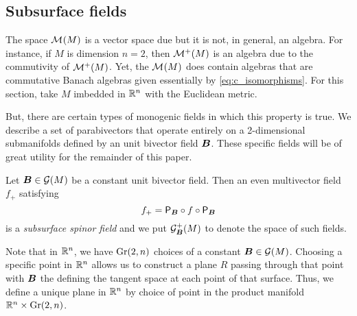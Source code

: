 \subsection{Subsurface fields}

The space $\mathcal{M}^{}(M)$ is a vector space due but it is not, in general, an algebra. For instance, if $M$ is dimension $n=2$, then $\mathcal{M}^{+}(M)$ is an algebra due to the commutivity of $\mathcal{M}^{+}(M)$. Yet, the $\mathcal{M}^{}(M)$ does contain algebras that are commutative Banach algebras given essentially by \cref{eq:c_isomorphisms}. For this section, take $M$ imbedded in $\mathbb{R}^n$ with the Euclidean metric.

But, there are certain types of monogenic fields in which this property is true. We describe a set of parabivectors that operate entirely on a 2-dimensional submanifolds defined by an unit bivector field $\boldsymbol{B}$. These specific fields will be of great utility for the remainder of this paper.
\begin{definition}
    Let $\boldsymbol{B} \in \mathcal{G}(M)$ be a constant unit bivector field. Then an even multivector field $f_+$ satisfying
    \begin{equation}
    f_+ = \mathsf{P}_{\boldsymbol{B}} \circ f \circ \mathsf{P}_{\boldsymbol{B}}
    \end{equation}
    is a \emph{subsurface spinor field} and we put $\mathcal{G}_{\boldsymbol{B}}^+(M)$ to denote the space of such fields.
\end{definition} 
Note that in $\mathbb{R}^n$, we have $\operatorname{Gr}(2,n)$ choices of a constant $\boldsymbol{B}\in \mathcal{G}(M)$. Choosing a specific point in $\mathbb{R}^n$ allows us to construct a plane $R$ passing through that point with $\boldsymbol{B}$ the defining the tangent space at each point of that surface. Thus, we define a unique plane in $\mathbb{R}^n$ by choice of point in the product manifold $\mathbb{R}^n \times \operatorname{Gr}(2,n)$.

